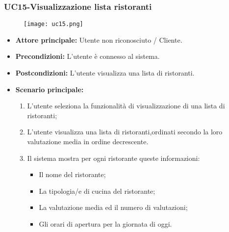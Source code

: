 \pagebreak
\subsubsection{UC15-Visualizzazione lista ristoranti}
\begin{figure}[h] \texttt{[image: uc15.png]} \end{figure} 
\begin{itemize}
\item \textbf{Attore principale:} Utente non riconosciuto / Cliente.
\item \textbf{Precondizioni:} L'utente è connesso al sistema.
\item \textbf{Postcondizioni:} L'utente visualizza una lista di ristoranti.
\item \textbf{Scenario principale:}
\begin{enumerate}
    \item L'utente seleziona la funzionalità di visualizzazione di una lista di ristoranti;
    \item L'utente visualizza una lista di ristoranti,ordinati secondo la loro valutazione media in ordine decrescente.
    \item Il sistema mostra per ogni ristorante queste informazioni:
       \begin{itemize}
           \item Il nome del ristorante;
           \item La tipologia/e di cucina del ristorante;
           \item La valutazione media ed il numero di valutazioni;
           \item Gli orari di apertura per la giornata di oggi.
       \end{itemize}
\end{enumerate}
\end{itemize}

\pagebreak

